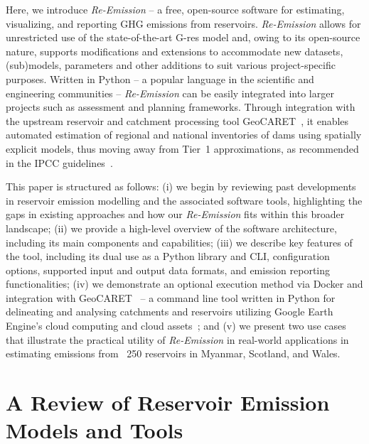 \documentclass[final,1p,times]{elsarticle}
\begin{document}
Here, we introduce \textit{Re-Emission} -- a free, open-source software for estimating, visualizing, and reporting \ac{GHG} emissions from reservoirs. 
\textit{Re-Emission} allows for unrestricted use of the state-of-the-art G-res model and, owing to its open-source nature, supports modifications and extensions to accommodate new datasets, (sub)models, parameters and other additions to suit various project-specific purposes. 
Written in Python -- a popular language in the scientific and engineering communities -- \textit{Re-Emission} can be easily integrated into larger projects such as assessment and planning frameworks.
Through integration with the upstream reservoir and catchment processing tool GeoCARET~\cite{heettool}, it enables automated estimation of regional and national inventories of dams using spatially explicit models, thus moving away from Tier~1 approximations, as recommended in the IPCC guidelines~\cite{IPCC2019}.

This paper is structured as follows: (i) we begin by reviewing past developments in reservoir emission modelling and the associated software tools, highlighting the gaps in existing approaches and how our \textit{Re-Emission} fits within this broader landscape; (ii) we provide a high-level overview of the software architecture, including its main components and capabilities; (iii) we describe key features of the tool, including its dual use as a Python library and \ac{CLI}, configuration options, supported input and output data formats, and emission reporting functionalities; (iv) we demonstrate an optional execution method via Docker and integration with GeoCARET~\cite{heettool} -- a command line tool written in Python for delineating and analysing catchments and reservoirs utilizing Google Earth Engine's cloud computing and cloud assets~\cite{Gorelick2017}; and (v) we present two use cases that illustrate the practical utility of \textit{Re-Emission} in real-world applications in estimating emissions from ~250 reservoirs in Myanmar, Scotland, and Wales.


\section{A Review of Reservoir Emission Models and Tools}
\label{sec:related_work}
\end{document}
